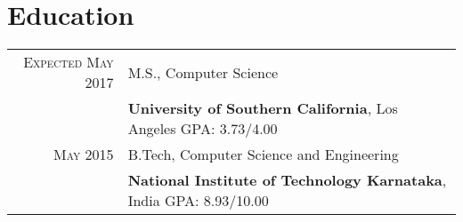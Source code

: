 \section{Education}
\begin{tabular}{rl}

\textsc{Expected May 2017} & M.S., Computer Science\\
&\textbf{University of Southern California}, Los Angeles\hspace{2.8cm} GPA: 3.73/4.00
\\
\textsc{May} 2015 & B.Tech, Computer Science and Engineering \\
&\textbf{National Institute of Technology Karnataka}, India\hspace{2cm} GPA: 8.93/10.00

\end{tabular}
\vspace{5pt}
